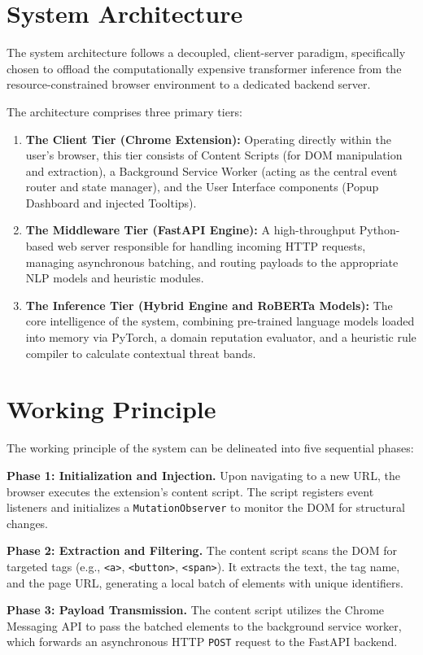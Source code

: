 \documentclass[12pt,a4paper]{report}
\begin{document}
\section{System Architecture}
The system architecture follows a decoupled, client-server paradigm, specifically chosen to offload the computationally expensive transformer inference from the resource-constrained browser environment to a dedicated backend server.

The architecture comprises three primary tiers:
\begin{enumerate}
    \item \textbf{The Client Tier (Chrome Extension):} Operating directly within the user's browser, this tier consists of Content Scripts (for DOM manipulation and extraction), a Background Service Worker (acting as the central event router and state manager), and the User Interface components (Popup Dashboard and injected Tooltips).
    \item \textbf{The Middleware Tier (FastAPI Engine):} A high-throughput Python-based web server responsible for handling incoming HTTP requests, managing asynchronous batching, and routing payloads to the appropriate NLP models and heuristic modules.
    \item \textbf{The Inference Tier (Hybrid Engine and RoBERTa Models):} The core intelligence of the system, combining pre-trained language models loaded into memory via PyTorch, a domain reputation evaluator, and a heuristic rule compiler to calculate contextual threat bands.
\end{enumerate}

\section{Working Principle}
The working principle of the system can be delineated into five sequential phases:

\textbf{Phase 1: Initialization and Injection.} Upon navigating to a new URL, the browser executes the extension's content script. The script registers event listeners and initializes a \texttt{MutationObserver} to monitor the DOM for structural changes.

\textbf{Phase 2: Extraction and Filtering.} The content script scans the DOM for targeted tags (e.g., \texttt{<a>}, \texttt{<button>}, \texttt{<span>}). It extracts the text, the tag name, and the page URL, generating a local batch of elements with unique identifiers.

\textbf{Phase 3: Payload Transmission.} The content script utilizes the Chrome Messaging API to pass the batched elements to the background service worker, which forwards an asynchronous HTTP \texttt{POST} request to the FastAPI backend.
\end{document}
